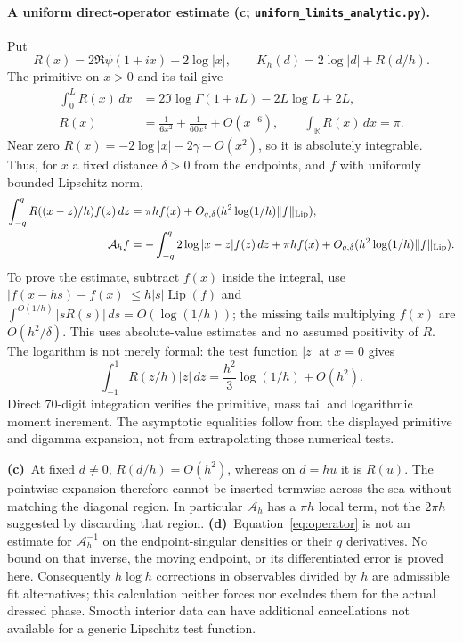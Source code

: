 \documentclass[11pt,a4paper]{article}
\newcommand{\C}{\textbf{(c)}\ }
\newcommand{\D}{\textbf{(d)}\ }
\newcommand{\scr}[1]{\texttt{uniform\_\allowbreak limits\_\allowbreak #1.py}}
\begin{document}
\paragraph{A uniform direct-operator estimate (c; \scr{analytic}).}
Put
\begin{equation}
 R(x)=2\Re\psi(1+ix)-2\log|x|,
 \qquad K_h(d)=2\log|d|+R(d/h).
\end{equation}
The primitive on $x>0$ and its tail give
\begin{align}
 \int_0^L R(x)\,dx
 &=2\Im\log\Gamma(1+iL)-2L\log L+2L,\\
 R(x)&=\frac1{6x^2}+\frac1{60x^4}+O(x^{-6}),\qquad
 \int_{\mathbb R}R(x)\,dx=\pi.\label{eq:mass}
\end{align}
Near zero $R(x)=-2\log|x|-2\gamma+O(x^2)$, so it is absolutely integrable.
Thus, for $x$ a fixed distance $\delta>0$ from the endpoints, and $f$ with
uniformly bounded Lipschitz norm,
\begin{align}
 \int_{-q}^q R((x-z)/h)f(z)\,dz
 &=\pi h f(x)+O_{q,\delta}(h^2\log(1/h)\|f\|_{\rm Lip}),\\
 \mathcal A_h f
 &=-\int_{-q}^q2\log|x-z|f(z)\,dz+\pi h f(x)
   +O_{q,\delta}(h^2\log(1/h)\|f\|_{\rm Lip}).\label{eq:operator}
\end{align}
To prove the estimate, subtract $f(x)$ inside the integral, use
$|f(x-hs)-f(x)|\leq h|s|\operatorname{Lip}(f)$ and
$\int^{O(1/h)} |sR(s)|\,ds=O(\log(1/h))$; the missing tails multiplying
$f(x)$ are $O(h^2/\delta)$. This uses absolute-value estimates and no assumed
positivity of $R$. The logarithm is not merely formal: the test function
$|z|$ at $x=0$ gives
\begin{equation}
 \int_{-1}^1R(z/h)|z|\,dz
 =\frac{h^2}{3}\log(1/h)+O(h^2).\label{eq:cusp}
\end{equation}
Direct 70-digit integration verifies the primitive, mass tail and logarithmic
moment increment. The asymptotic equalities follow from the displayed
primitive and digamma expansion, not from extrapolating those numerical tests.

\C At fixed $d\ne0$, $R(d/h)=O(h^2)$, whereas on $d=hu$ it is $R(u)$.
The pointwise expansion therefore cannot be inserted termwise across the sea
without matching the diagonal region. In particular $\mathcal A_h$ has a
$\pi h$ local term, not the $2\pi h$ suggested by discarding that region.
\D Equation~\eqref{eq:operator} is not an estimate for
$\mathcal A_h^{-1}$ on the endpoint-singular densities or their $q$ derivatives.
No bound on that inverse, the moving endpoint, or its differentiated error is
proved here. Consequently $h\log h$ corrections in observables divided by $h$
are admissible fit alternatives; this calculation neither forces nor excludes
them for the actual dressed phase. Smooth interior data can have additional
cancellations not available for a generic Lipschitz test function.
\end{document}

